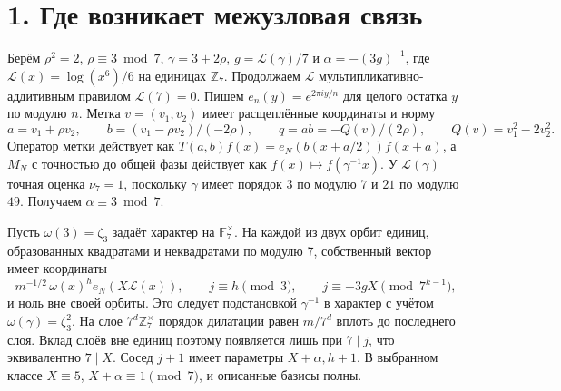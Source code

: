 \documentclass[11pt,a4paper]{article}
\newcommand{\sect}[1]{\section*{\sffamily\color{ink}#1}}
\newcommand{\Zp}{\mathbb Z_7}
\begin{document}
\newpage
\sect{1. Где возникает межузловая связь}
Берём \(\rho^2=2\), \(\rho\equiv3\bmod7\), \(\gamma=3+2\rho\), \(g=\mathcal L(\gamma)/7\) и \(\alpha=-(3g)^{-1}\), где \(\mathcal L(x)=\log(x^6)/6\) на единицах \(\Zp\). Продолжаем \(\mathcal L\) мультипликативно-аддитивным правилом \(\mathcal L(7)=0\). Пишем \(e_n(y)=e^{2\pi i y/n}\) для целого остатка \(y\) по модулю \(n\). Метка \(v=(v_1,v_2)\) имеет расщеплённые координаты и норму
\[
  a=v_1+\rho v_2,\qquad b=(v_1-\rho v_2)/(-2\rho),\qquad
  q=ab=-Q(v)/(2\rho),\qquad Q(v)=v_1^2-2v_2^2 .
\]
Оператор метки действует как \(T(a,b)f(x)=e_N(b(x+a/2))f(x+a)\), а \(M_N\) с точностью до общей фазы действует как \(f(x)\mapsto f(\gamma^{-1}x)\). У \(\mathcal L(\gamma)\) точная оценка \(\nu_7=1\), поскольку \(\gamma\) имеет порядок \(3\) по модулю \(7\) и \(21\) по модулю \(49\). Получаем \(\alpha\equiv3\bmod7\).

Пусть \(\omega(3)=\zeta_3\) задаёт характер на \(\mathbb F_7^\times\). На каждой из двух орбит единиц, образованных квадратами и неквадратами по модулю 7, собственный вектор имеет координаты
\[
   m^{-1/2}\,\omega(x)^h e_N(X\mathcal L(x)),\qquad
   j\equiv h\pmod3,\qquad j\equiv -3gX\pmod{7^{k-1}},
\]
и ноль вне своей орбиты. Это следует подстановкой \(\gamma^{-1}\) в характер с учётом \(\omega(\gamma)=\zeta_3^2\). На слое \(7^d\Zp^\times\) порядок дилатации равен \(m/7^d\) вплоть до последнего слоя. Вклад слоёв вне единиц поэтому появляется лишь при \(7\mid j\), что эквивалентно \(7\mid X\). Сосед \(j+1\) имеет параметры \(X+\alpha,h+1\). В выбранном классе \(X\equiv5\), \(X+\alpha\equiv1\pmod7\), и описанные базисы полны.
\end{document}
